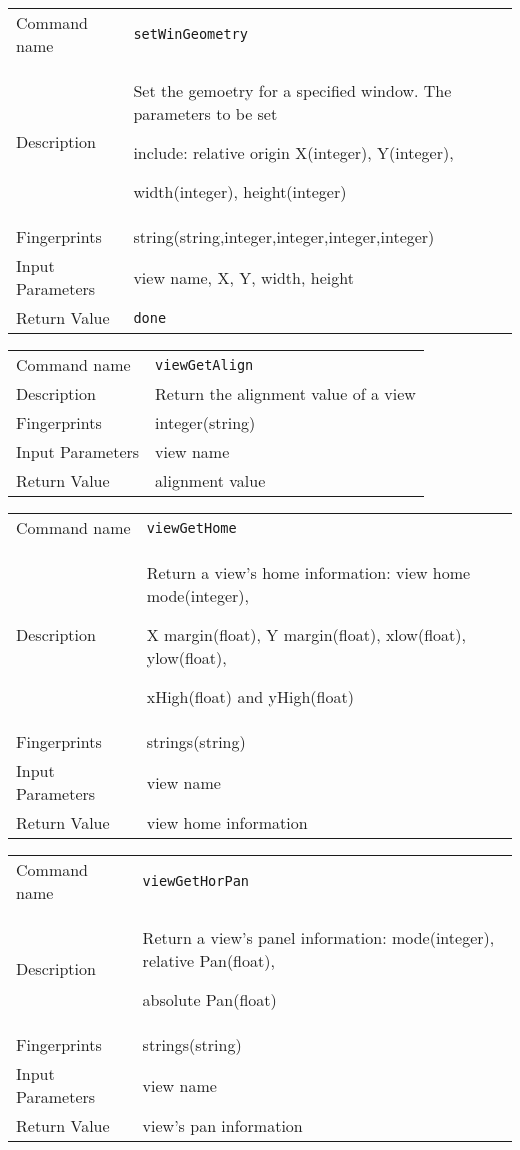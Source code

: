 \noindent
\begin{tabular}{l|p{5in}}
\hline
Command name &{\tt setWinGeometry }\\ 
Description &
Set the gemoetry for a specified window. The parameters to be set 
 
include: relative origin X(integer), Y(integer), 
 
width(integer), height(integer)
 	\\
Fingerprints & string(string,integer,integer,integer,integer)\\
Input Parameters&view name, X, Y, width, height  \\
Return Value&{\tt done}\\
\hline
\end{tabular}
\bigskip

\noindent
\begin{tabular}{l|p{5in}}
\hline
Command name &{\tt viewGetAlign }\\ 
Description &
Return the alignment value of a view
 	\\
Fingerprints & integer(string)\\
Input Parameters&view name\\
Return Value&alignment value\\
\hline
\end{tabular}
\bigskip

\noindent
\begin{tabular}{l|p{5in}}
\hline
Command name &{\tt viewGetHome }\\ 
Description &
Return a view's home information: view home mode(integer),
 
X margin(float), Y margin(float), xlow(float), ylow(float),
 
xHigh(float) and yHigh(float)
 	\\
Fingerprints & strings(string)\\
Input Parameters&view name\\
Return Value&view home information\\
\hline
\end{tabular}
\bigskip

\noindent
\begin{tabular}{l|p{5in}}
\hline
Command name &{\tt viewGetHorPan }\\ 
Description &
Return a view's panel information: mode(integer), relative Pan(float),
 
absolute Pan(float)
 	\\
Fingerprints & strings(string)\\
Input Parameters&view name\\
Return Value&view's pan information\\
\hline
\end{tabular}
\bigskip

